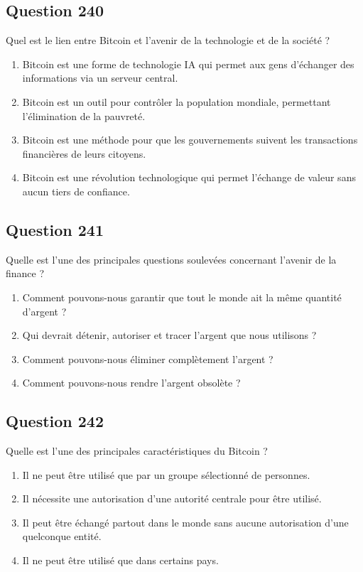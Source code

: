 \documentclass[12pt,a4paper]{article}
\begin{document}
\bigskip


\subsection*{Question 240}
Quel est le lien entre Bitcoin et l'avenir de la technologie et de la société ?

\begin{enumerate}[label=\Alph*., leftmargin=*]
\item Bitcoin est une forme de technologie IA qui permet aux gens d'échanger des informations via un serveur central.
\item Bitcoin est un outil pour contrôler la population mondiale, permettant l'élimination de la pauvreté.
\item Bitcoin est une méthode pour que les gouvernements suivent les transactions financières de leurs citoyens.
\item Bitcoin est une révolution technologique qui permet l'échange de valeur sans aucun tiers de confiance.
\end{enumerate}

\bigskip


\subsection*{Question 241}
Quelle est l'une des principales questions soulevées concernant l'avenir de la finance ?

\begin{enumerate}[label=\Alph*., leftmargin=*]
\item Comment pouvons-nous garantir que tout le monde ait la même quantité d'argent ?
\item Qui devrait détenir, autoriser et tracer l'argent que nous utilisons ?
\item Comment pouvons-nous éliminer complètement l'argent ?
\item Comment pouvons-nous rendre l'argent obsolète ?
\end{enumerate}

\bigskip


\subsection*{Question 242}
Quelle est l'une des principales caractéristiques du Bitcoin ?

\begin{enumerate}[label=\Alph*., leftmargin=*]
\item Il ne peut être utilisé que par un groupe sélectionné de personnes.
\item Il nécessite une autorisation d'une autorité centrale pour être utilisé.
\item Il peut être échangé partout dans le monde sans aucune autorisation d'une quelconque entité.
\item Il ne peut être utilisé que dans certains pays.
\end{enumerate}
\end{document}
